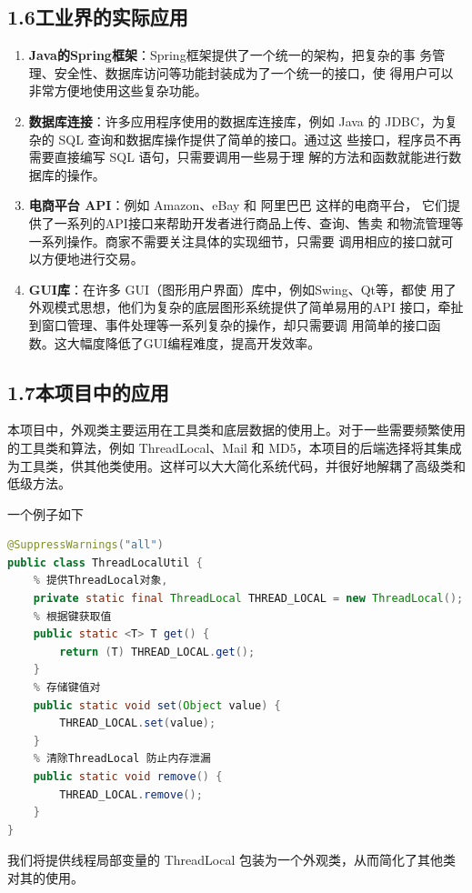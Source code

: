 \documentclass[24pt,a4paper]{article}%
\begin{document}
\subsection*{\songti 1.6工业界的实际应用}
\begin{enumerate}
    \item \textbf{Java的Spring框架}：Spring框架提供了一个统一的架构，把复杂的事
务管理、安全性、数据库访问等功能封装成为了一个统一的接口，使
得用户可以非常方便地使用这些复杂功能。
    \item \textbf{数据库连接}：许多应用程序使用的数据库连接库，例如 Java 的
JDBC，为复杂的 SQL 查询和数据库操作提供了简单的接口。通过这
些接口，程序员不再需要直接编写 SQL 语句，只需要调用一些易于理
解的方法和函数就能进行数据库的操作。
    \item \textbf{电商平台 API}：例如 Amazon、eBay 和 阿里巴巴 这样的电商平台，
它们提供了一系列的API接口来帮助开发者进行商品上传、查询、售卖
和物流管理等一系列操作。商家不需要关注具体的实现细节，只需要
调用相应的接口就可以方便地进行交易。
    \item \textbf{GUI库}：在许多 GUI（图形用户界面）库中，例如Swing、Qt等，都使
用了外观模式思想，他们为复杂的底层图形系统提供了简单易用的API
接口，牵扯到窗口管理、事件处理等一系列复杂的操作，却只需要调
用简单的接口函数。这大幅度降低了GUI编程难度，提高开发效率。
\end{enumerate}

\subsection*{\songti 1.7本项目中的应用}
本项目中，外观类主要运用在工具类和底层数据的使用上。对于一些需要频繁使用的工具类和算法，例如 ThreadLocal、Mail 和 MD5，本项目的后端选择将其集成为工具类，供其他类使用。这样可以大大简化系统代码，并很好地解耦了高级类和低级方法。

一个例子如下
\begin{lstlisting}[language=Java]
@SuppressWarnings("all")
public class ThreadLocalUtil {
    % 提供ThreadLocal对象,
    private static final ThreadLocal THREAD_LOCAL = new ThreadLocal();
    % 根据键获取值
    public static <T> T get() {
        return (T) THREAD_LOCAL.get();
    }
    % 存储键值对
    public static void set(Object value) {
        THREAD_LOCAL.set(value);
    }
    % 清除ThreadLocal 防止内存泄漏
    public static void remove() {
        THREAD_LOCAL.remove();
    }
}
\end{lstlisting}
我们将提供线程局部变量的 ThreadLocal 包装为一个外观类，从而简化了其他类对其的使用。
\end{document}
